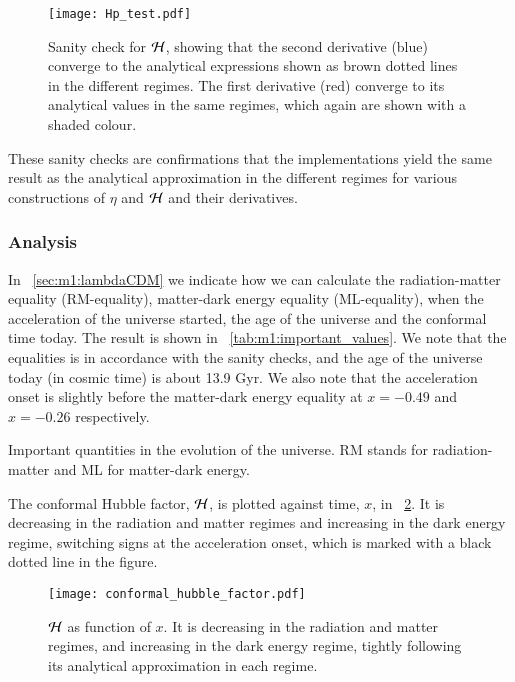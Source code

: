    \begin{figure}
        \texttt{[image: Hp\_test.pdf]}
        \caption{Sanity check for $\mathcal{H}$, showing that the second derivative (blue) converge to the analytical expressions shown as brown dotted lines in the different regimes. The first derivative (red) converge to its analytical values in the same regimes, which again are shown with a shaded colour.}
        \label{fig:m1:Hp_tests}
    \end{figure}

    These sanity checks are confirmations that the implementations yield the same result as the analytical approximation in the different regimes for various constructions of $\eta$ and $\mathcal{H}$ and their derivatives.
    
\subsubsection{Analysis}

    In ~\cref{sec:m1:lambdaCDM} we indicate how we can calculate the radiation-matter equality (RM-equality), matter-dark energy equality (ML-equality), when the acceleration of the universe started, the age of the universe and the conformal time today. The result is shown in ~\cref{tab:m1:important_values}. We note that the equalities is in accordance with the sanity checks, and the age of the universe today (in cosmic time) is about 13.9 Gyr. We also note that the acceleration onset is slightly before the matter-dark energy equality at $x=-0.49$ and $x=-0.26$ respectively. 
    \begin{table}
        
        \caption{Important quantities in the evolution of the universe. RM stands for radiation-matter and ML for matter-dark energy.}
        \label{tab:m1:important_values}
    \end{table}

    The conformal Hubble factor, $\mathcal{H}$, is plotted against time, $x$, in ~\cref{fig:m1:conformal_hubble_factor_Hp}. It is decreasing in the radiation and matter regimes and increasing in the dark energy regime, switching signs at the acceleration onset, which is marked with a black dotted line in the figure. 
    \begin{figure}
        \texttt{[image: conformal\_hubble\_factor.pdf]}
        \caption{$\mathcal{H}$ as function of $x$. It is decreasing in the radiation and matter regimes, and increasing in the dark energy regime, tightly following its analytical approximation in each regime.}
        \label{fig:m1:conformal_hubble_factor_Hp}
    \end{figure}

